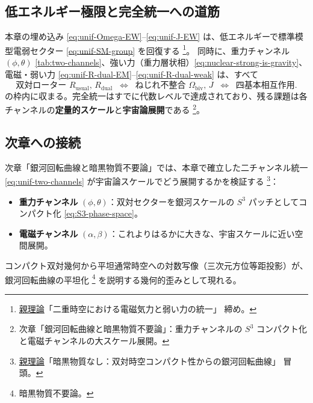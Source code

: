\documentclass[dvipdfmx,a4paper,oneside]{jsbook}
\numberwithin{equation}{chapter}
\begin{document}
\subsection{低エネルギー極限と完全統一への道筋}

本章の埋め込み \eqref{eq:unif-Omega-EW}–\eqref{eq:unif-J-EW} は、低エネルギーで標準模型電弱セクター \eqref{eq:unif-SM-group} を回復する \footnote{\hyperref[sec:sister-manuscripts]{親理論}「二重時空における電磁気力と弱い力の統一」 締め。}。
同時に、重力チャンネル \((\phi,\theta)\) \eqref{tab:two-channels}、強い力（重力層状相）\eqref{eq:nuclear-strong-is-gravity}、電磁・弱い力 \eqref{eq:unif-R-dual-EM}–\eqref{eq:unif-R-dual-weak} は、すべて
\begin{equation}
  \boxed{\;
  \text{双対ローター } R_{\mathrm{usual}},\, R_{\mathrm{dual}}
  \;\;\Longleftrightarrow\;\;
  \text{ねじれ不整合 } \Omega_{\mathrm{biv}},\, J
  \;\;\Longleftrightarrow\;\;
  \text{四基本相互作用}.
  \;}
  \label{eq:unif-complete}
\end{equation}
の枠内に収まる。完全統一はすでに代数レベルで達成されており、残る課題は各チャンネルの\textbf{定量的スケール}と\textbf{宇宙論展開}である \footnote{次章「銀河回転曲線と暗黒物質不要論」：重力チャンネルの \(S^3\) コンパクト化と電磁チャンネルの大スケール展開。}。

\subsection{次章への接続}

次章「銀河回転曲線と暗黒物質不要論」では、本章で確立した二チャンネル統一 \eqref{eq:unif-two-channels} が宇宙論スケールでどう展開するかを検証する \footnote{\hyperref[sec:sister-manuscripts]{親理論}「暗黒物質なし：双対時空コンパクト性からの銀河回転曲線」 冒頭。}：
\begin{itemize}[leftmargin=2em]
  \item \textbf{重力チャンネル} \((\phi, \theta)\)：双対セクターを銀河スケールの \(S^3\) パッチとしてコンパクト化 \eqref{eq:S3-phase-space}。
  \item \textbf{電磁チャンネル} \((\alpha, \beta)\)：これよりはるかに大きな、宇宙スケールに近い空間展開。
\end{itemize}
コンパクト双対幾何から平坦通常時空への対数写像（三次元方位等距投影）が、銀河回転曲線の平坦化 \footnote{暗黒物質不要論。} を説明する幾何的歪みとして現れる。
\end{document}
